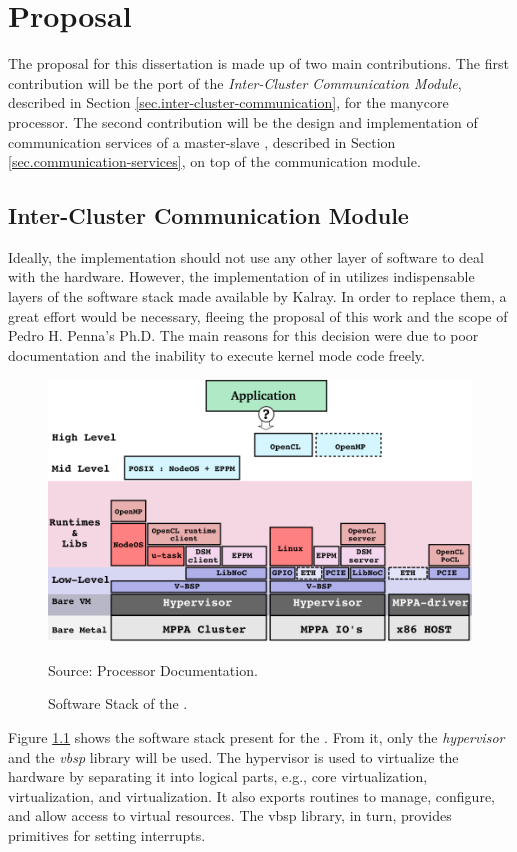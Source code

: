 \chapter{Proposal}
\label{ch.proposal}

The proposal for this dissertation is made up of two main contributions.
The first contribution will be the port of the \textit{Inter-Cluster Communication Module},
described in Section \ref{sec.inter-cluster-communication}, for the \mppa manycore processor.
The second contribution will be the design and implementation of communication services
of a master-slave \os, described in Section \ref{sec.communication-services}, on top of
the communication module.

\section{Inter-Cluster Communication Module}

	Ideally, the \hal implementation should not use any other layer of software to
	deal with the hardware. However, the implementation of \hal in \mppa utilizes
	indispensable layers of the software stack made available by Kalray.
	In order to replace them, a great effort would be necessary, fleeing the proposal
	of this work and the scope of Pedro H. Penna's Ph.D.
	The main reasons for this decision were due to poor documentation and the
	inability to execute kernel mode code freely.

	\begin{figure}[t]
		\centering
		\caption{Software Stack of the \mppa.}

		\includegraphics[width=.7\textwidth]{images/software-stack.png}

		Source: \mppa Processor Documentation.

		\label{fig.software-stack}
	\end{figure}

	Figure \ref{fig.software-stack} shows the software stack present for the \mppa.
	From it, only the \textit{hypervisor} and the \textit{vbsp} library will be used.
	The hypervisor is used to virtualize the hardware by separating it into logical
	parts, e.g., core virtualization, \cnoc virtualization, and \dnoc virtualization.
	It also exports routines to manage, configure, and allow access to virtual resources.
	The vbsp library, in turn, provides primitives for setting interrupts.


